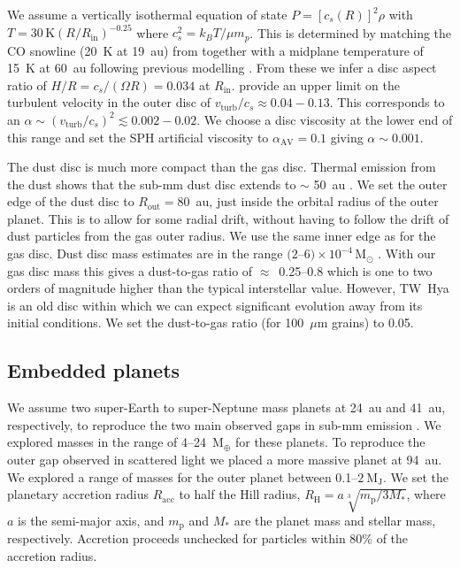 \documentclass[usenatbib,a4paper,times]{mnras}
\renewcommand{\sun}{\mathrm{M}_{\odot}}
\renewcommand{\earth}{\mathrm{M}_{\oplus}}
\begin{document}
We assume a vertically isothermal equation of state $P={[c_s(R)]}^2\rho$ with $T
= 30\,\mathrm{K} {(R/R_{\mathrm{in}})}^{-0.25}$ where $c_s^2={k_B}T/\mu m_p$.
This is determined by matching the CO snowline (20~K at 19~au) from
\citet{vant-hoff:2017} together with a midplane temperature of 15~K at 60~au
following previous modelling \citep{andrews:2012}. From these we infer a disc
aspect ratio of $H/R = c_s/(\Omega R) = 0.034$ at $R_{\mathrm{in}}$.
\citet{flaherty:2018} provide an upper limit on the turbulent velocity in the
outer disc of $v_{\mathrm{turb}}/c_s\approx 0.04-0.13$. This corresponds to an
$\alpha \sim {(v_{\mathrm{turb}}/c_s)}^2 \lesssim 0.002-0.02$. We choose a disc
viscosity \citep{shakura:1973} at the lower end of this range and set the SPH
artificial viscosity to $\alpha_{\mathrm{AV}} = 0.1$ giving $\alpha \sim 0.001$.

The dust disc is much more compact than the gas disc. Thermal emission from the
dust shows that the sub-mm dust disc extends to $\sim$ 50~au
\citep{andrews:2016}. We set the outer edge of the dust disc to
$R_{\mathrm{out}}=80$~au, just inside the orbital radius of the outer planet.
This is to allow for some radial drift, without having to follow the drift of
dust particles from the gas outer radius. We use the same inner edge as for the
gas disc. Dust disc mass estimates are in the range $(2$--$6)\times
10^{-4}\,\sun{}$ \citep{calvet:2002, thi:2010}. With our gas disc mass this
gives a dust-to-gas ratio of $\approx$~0.25--0.8 which is one to two orders of
magnitude higher than the typical interstellar value. However, TW~Hya is an old
disc within which we can expect significant evolution away from its initial
conditions. We set the dust-to-gas ratio (for 100~$\mu$m grains) to 0.05.





\subsection{Embedded planets}

We assume two super-Earth to super-Neptune mass planets at 24~au and 41~au,
respectively, to reproduce the two main observed gaps in sub-mm emission
\citep{andrews:2016}. We explored masses in the range of 4--24~$\earth{}$ for
these planets. To reproduce the outer gap observed in scattered light
\citep{van-boekel:2017} we placed a more massive planet at 94~au. We explored a
range of masses for the outer planet between 0.1--$2~\mathrm{M_J}$. We set the
planetary accretion radius $R_{\mathrm{acc}}$ to half the Hill radius,
$R_{\mathrm{H}} = a\sqrt[3]{m_{\mathrm{p}}/3M_*}$, where $a$ is the semi-major
axis, and $m_{\mathrm{p}}$ and $M_*$ are the planet mass and stellar mass,
respectively. Accretion proceeds unchecked for particles within 80\% of the
accretion radius.
\end{document}
